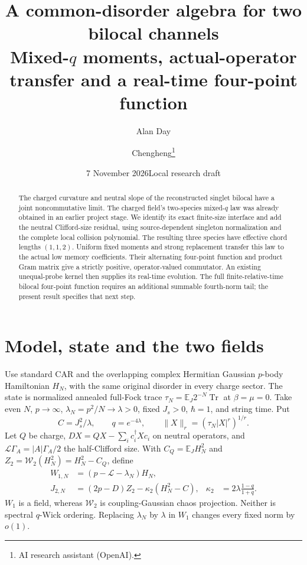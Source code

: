 \documentclass[11pt]{article}
\title{A common-disorder algebra for two bilocal channels\\
\large Mixed-$q$ moments, actual-operator transfer and a real-time four-point function}
\author{Alan Day \and Chengheng\thanks{AI research assistant (OpenAI).}}
\date{7 November 2026\quad Local research draft}
\newcommand{\EE}{\mathbb E}
\newcommand{\LL}{\mathcal L}
\newcommand{\Wc}{\mathcal W}
\begin{document}
\maketitle
\begin{abstract}
The charged curvature and neutral slope of the reconstructed singlet
bilocal have a joint noncommutative limit. The charged field's
two-species mixed-$q$ law was already obtained in an earlier project
stage. We identify its exact finite-size interface and add the neutral
Clifford-size residual, using source-dependent singleton normalization
and the complete local collision polynomial. The resulting three
species have effective chord lengths $(1,1,2)$. Uniform fixed moments
and strong replacement transfer this law to the actual low memory
coefficients. Their alternating four-point function and product Gram
matrix give a strictly positive, operator-valued commutator. An existing
unequal-probe kernel then supplies its real-time evolution. The full
finite-relative-time bilocal four-point function requires an additional
summable fourth-norm tail; the present result specifies that next step.
\end{abstract}

\section{Model, state and the two fields}
Use standard CAR and the overlapping complex Hermitian Gaussian
$p$-body Hamiltonian $H_N$, with the same original disorder in every
charge sector. The state is normalized annealed full-Fock trace
$\tau_N=\EE_J2^{-N}\operatorname{Tr}$ at $\beta=\mu=0$.
Take even $N$, $p\to\infty$, $\lambda_N=p^2/N\to\lambda>0$,
fixed $J_s>0$, $\hbar=1$, and string time. Put
\begin{equation}
 C=J_s^2/\lambda,\qquad q=e^{-4\lambda},\qquad
 \|X\|_r=(\tau_N|X|^r)^{1/r}.
\end{equation}
Let $Q$ be charge, $DX=QX-\sum_i c_i^\dagger Xc_i$ on neutral
operators, and $\LL\Gamma_A=|A|\Gamma_A/2$ the half-Clifford size.
With $C_Q=\EE_JH_N^2$ and $Z_2=\Wc_2(H_N^2)=H_N^2-C_Q$, define
\begin{align}
 W_{1,N}&=(p-\LL-\lambda_N)H_N,\\
 J_{2,N}&=(2p-D)Z_2-\kappa_2(H_N^2-C),
 &\kappa_2&=2\lambda\frac{1-q}{1+q}.\label{fields}
\end{align}
$W_1$ is a field, whereas $\Wc_2$ is coupling-Gaussian chaos
projection. Neither is spectral $q$-Wick ordering. Replacing
$\lambda_N$ by $\lambda$ in $W_1$ changes every fixed norm by $o(1)$.
\end{document}
